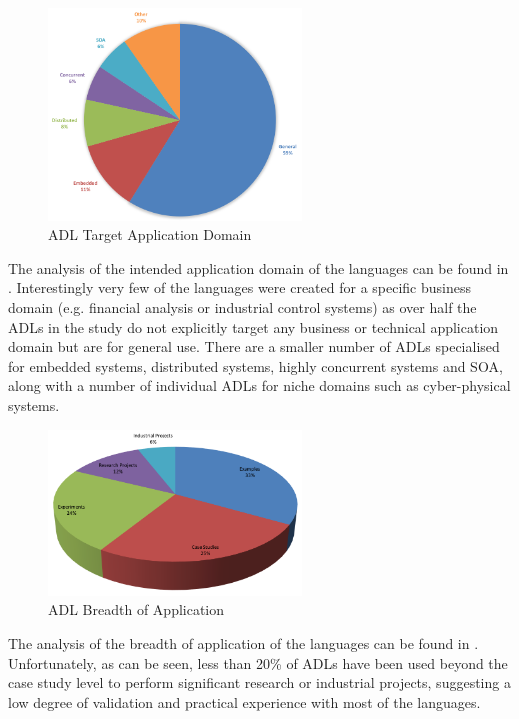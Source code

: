 \begin{figure}
\centering
\includegraphics[width=0.6\textwidth]{Figures/litreview-adl-domains}
\caption{ADL Target Application Domain}
\label{figure:litreview-adl-domains}
\end{figure}

The analysis of the intended application domain of the languages can be found in .  Interestingly very few of the languages were created for a specific business domain (e.g. financial analysis or industrial control systems) as over half the ADLs in the study do not explicitly target any business or technical application domain but are for general use.  There are a smaller number of ADLs specialised for embedded systems, distributed systems, highly concurrent systems and SOA, along with a number of individual ADLs for niche domains such as cyber-physical systems.

\begin{figure}
\centering
\includegraphics[width=0.6\textwidth]{Figures/litreview-adl-validation}
\caption{ADL Breadth of Application}
\label{figure:litreview-adl-validation}
\end{figure}

The analysis of the breadth of application of the languages can be found in .  Unfortunately, as can be seen, less than 20\% of ADLs have been used beyond the case study level to perform significant research or industrial projects, suggesting a low degree of validation and practical experience with most of the languages.

